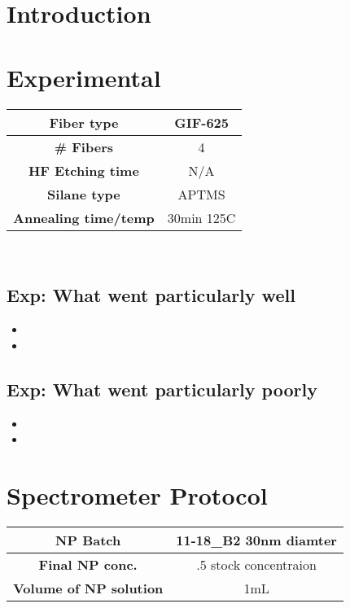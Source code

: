 \section{Introduction}

\section{Experimental}


\begin{center}
\begin{tabular}{| c | c |}
 \hline\hline
 {\bf Fiber type} & GIF-625 \\ \hline
 {\bf \# Fibers} & 4  \\ \hline
 {\bf HF Etching time} & N/A \\ \hline
 {\bf Silane type} & APTMS \\ \hline
 {\bf Annealing time/temp} & 30min 125C  \\ \hline
\end{tabular}
\end{center}

\\


\subsection{Exp: {\color{blue} What went particularly well}}

\begin{itemize}
\item{}
\item{}
\end{itemize}

\subsection{Exp: {\color{red} What went particularly poorly}}

\begin{itemize}
\item{}
\item{}
\end{itemize}

\section{Spectrometer Protocol}

\begin{center}
\begin{tabular}{| c | c |}
 \hline\hline
 {\bf NP Batch} & 11-18\_B2 30nm diamter \\ \hline
 {\bf Final NP conc.} & .5 stock concentraion  \\ \hline
 {\bf Volume of NP solution} & 1mL \\ \hline
\end{tabular}
\end{center}

